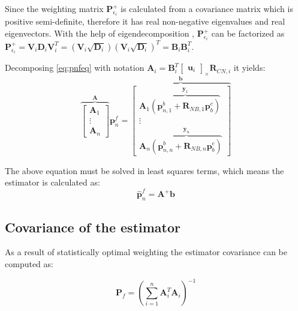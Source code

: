 Since the weighting matrix $\mathbf{P}_{\epsilon_i}^{+}$ is calculated from a covariance matrix which is positive semi-definite, therefore it has real non-negative eigenvalues and real eigenvectors. With the help of eigendecomposition \cite{matrixtheory}, $\mathbf{P}_{\epsilon_i}^{+}$ can be factorized as $\mathbf{P}_{\epsilon_i}^{+}=\mathbf{V}_i\mathbf{D}_i\mathbf{V}_i^T = (\mathbf{V}_i\sqrt{\mathbf{D}_i})(\mathbf{V}_i\sqrt{\mathbf{D}_i})^T = \mathbf{B}_i\mathbf{B}_i^T$.

Decomposing \eqref{eq:pnfeq} with notation $\mathbf{A}_i=\mathbf{B}_i^T\begin{bmatrix} \mathbf{u}_i \end{bmatrix}_\times\mathbf{R}_{CN, i}$ it yields:
\begin{equation}
    \overbrace{
    \begin{bmatrix}
        \mathbf{A}_1 \\ \vdots \\ \mathbf{A}_n
    \end{bmatrix}
    }^{\mathbf{A}} \mathbf{p}_n^f =
    \overbrace{
    \begin{bmatrix}
        \mathbf{A}_1\overbrace{(\mathbf{p}_{n, 1}^b+\mathbf{R}_{NB, 1}\mathbf{p}_b^c)}^{\mathbf{y}_1} \\ \vdots \\ \mathbf{A}_n\overbrace{(\mathbf{p}_{n, n}^b+\mathbf{R}_{NB, n}\mathbf{p}_b^c)}^{\mathbf{y}_n}
    \end{bmatrix}
    }^{\mathbf{b}}
    \label{eq:decomposed-linsys}
\end{equation}

The above equation must be solved in least squares terms, which means the estimator is calculated as:
\begin{equation}
    \hat{\mathbf{p}}_n^f = \mathbf{A}^+\mathbf{b}
    \label{eq:estimator}
\end{equation}

\subsection{Covariance of the estimator}

As a result of statistically optimal weighting the estimator covariance can be computed as:

\begin{equation}
    \mathbf{P}_{f} = \left(\sum_{i=1}^n \mathbf{A}_i^T\mathbf{A}_i\right)^{-1}
    \label{eq:covest}
\end{equation}

